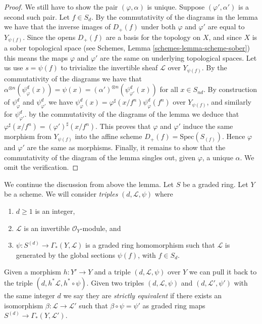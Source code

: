 \begin{proof}
\medskip\noindent
We still have to show the pair $(\varphi, \alpha)$ is unique.
Suppose $(\varphi', \alpha')$ is a second such pair.
Let $f \in S_d$. By the commutativity of the diagrams in the lemma we have
that the inverse images of $D_{+}(f)$ under both $\varphi$ and $\varphi'$
are equal to $Y_{\psi(f)}$. Since the opens $D_{+}(f)$ are a basis
for the topology on $X$, and since $X$ is a sober topological
space (see Schemes, Lemma \ref{schemes-lemma-scheme-sober})
this means the maps $\varphi$ and $\varphi'$ are the same
on underlying topological spaces. Let us use $s = \psi(f)$ to
trivialize the invertible sheaf $\mathcal{L}$ over $Y_{\psi(f)}$.
By the commutativity of the diagrams we have that
$\alpha^{\otimes n}(\psi^d_{\varphi}(x)) =
\psi(x) = (\alpha')^{\otimes n}(\psi^d_{\varphi'}(x))$
for all $x \in S_{nd}$. By construction of $\psi^d_{\varphi}$
and $\psi^d_{\varphi'}$ we have
$\psi^d_{\varphi}(x) = \varphi^\sharp(x/f^n) \psi^d_{\varphi}(f^n)$
over $Y_{\psi(f)}$,
and similarly for $\psi^d_{\varphi'}$. by the commutativity of
the diagrams of the lemma we deduce that
$\varphi^\sharp(x/f^n) = (\varphi')^\sharp(x/f^n)$.
This proves that $\varphi$ and $\varphi'$ induce the same morphism
from $Y_{\psi(f)}$ into the affine scheme $D_{+}(f) = \text{Spec}(S_{(f)})$.
Hence $\varphi$ and $\varphi'$ are the same as morphisms.
Finally, it remains to show that the commutativity of the
diagram of the lemma singles out, given $\varphi$, a unique
$\alpha$. We omit the verification.
\end{proof}

\noindent
We continue the discussion from above the lemma.
Let $S$ be a graded ring.
Let $Y$ be a scheme. We will consider {\it triples}
$(d, \mathcal{L}, \psi)$ where
\begin{enumerate}
\item $d \geq 1$ is an integer,
\item $\mathcal{L}$ is an invertible $\mathcal{O}_Y$-module, and
\item $\psi : S^{(d)} \to \Gamma_*(Y, \mathcal{L})$ is a graded
ring homomorphism such that $\mathcal{L}$ is generated by
the global sections $\psi(f)$, with $f \in S_d$.
\end{enumerate}
Given a morphism $h : Y' \to Y$ and a triple
$(d, \mathcal{L}, \psi)$ over $Y$ we can pull it back to the
triple $(d, h^*\mathcal{L}, h^* \circ \psi)$.
Given two triples $(d, \mathcal{L}, \psi)$ and
$(d, \mathcal{L}', \psi')$ with the same integer $d$
we say they are {\it strictly equivalent} if there exists
an isomorphism $\beta : \mathcal{L} \to \mathcal{L}'$
such that $\beta \circ \psi = \psi'$ as graded
ring maps $S^{(d)} \to \Gamma_*(Y, \mathcal{L}')$.

